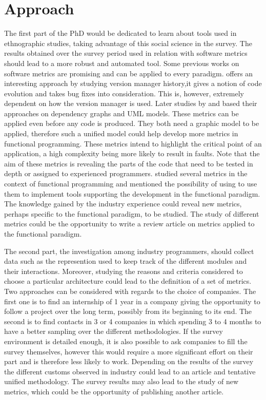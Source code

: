 \documentclass[12p]{article}
\begin{document}
\section*{Approach}
The first part of the PhD would be dedicated to learn about tools used
in ethnographic studies, taking advantage of this social science in
the survey. The results obtained over the survey period used in
relation with software metrics should lead to a more robust and
automated tool. Some previous works on software metrics are promising
and can be applied to every paradigm. \citet{zimmermann_mining_2005}
offers an interesting approach by studying version manager history,it
gives a notion of code evolution and takes bug fixes into
consideration. This is, however, extremely dependent on how the
version manager is used. Later studies by
\citet{zimmermann_predicting_2008} and \citet{soliman_utilizing_2010}
based their approaches on dependency graphs and UML models. These
metrics can be applied even before any code is produced. They both
need a graphic model to be applied, therefore such a unified model
could help develop more metrics in functional programming. These
metrics intend to highlight the critical point of an application, a
high complexity being more likely to result in faults. Note that the
aim of these metrics is revealing the parts of the code that need to
be tested in depth or assigned to experienced
programmers. \citet{ryder_software_2005} studied several metrics in
the context of functional programming and mentioned the possibility of
using to use them to implement tools supporting the development in the
functional paradigm. The knowledge gained by the industry experience
could reveal new metrics, perhaps specific to the functional paradigm,
to be studied. The study of different metrics could be the opportunity
to write a review article on metrics applied to the functional
paradigm.

The second part, the investigation among industry programmers, should
collect data such as the represention used to keep track of the
different modules and their interactions. Moreover, studying the
reasons and criteria considered to choose a particular architecture
could lead to the definition of a set of metrics. Two approaches can
be considered with regards to the choice of companies. The first one
is to find an internship of 1 year in a company giving the opportunity
to follow a project over the long term, possibly from its beginning to
its end. The second is to find contacts in 3 or 4 companies in which
spending 3 to 4 months to have a better sampling over the different
methodologies. If the survey environment is detailed enough, it is
also possible to ask companies to fill the survey themselves, however
this would require a more significant effort on their part and is
therefore less likely to work. Depending on the results of the survey the
different customs observed in industry could lead to an article and
tentative unified methodology. The survey results may also lead to the
study of new metrics, which could be the opportunity of publishing
another article.
\end{document}
